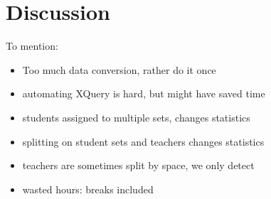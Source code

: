 \section{Discussion}
To mention:
\begin{itemize}
	\item Too much data conversion, rather do it once
	\item automating XQuery is hard, but might have saved time	
	\item students assigned to multiple sets, changes statistics
	\item splitting on student sets and teachers changes statistics
	\item teachers are sometimes split by space, we only detect \code{;}
	\item wasted hours: breaks included
\end{itemize}